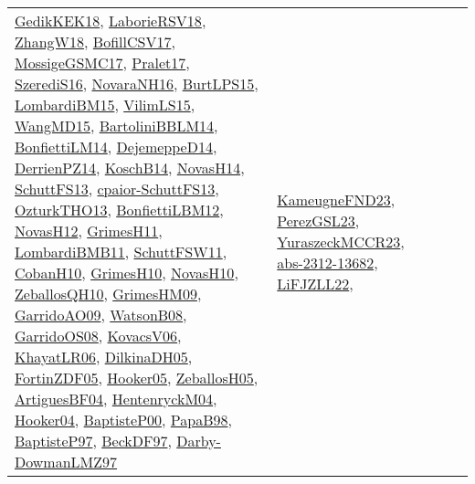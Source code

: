{\begin{longtable}{llp{6cm}p{6cm}p{6cm}}
\href{articles/GedikKEK18.pdf}{GedikKEK18}\cite{GedikKEK18}, \href{articles/LaborieRSV18.pdf}{LaborieRSV18}\cite{LaborieRSV18}, \href{articles/ZhangW18.pdf}{ZhangW18}\cite{ZhangW18}, \href{papers/BofillCSV17.pdf}{BofillCSV17}\cite{BofillCSV17}, \href{papers/MossigeGSMC17.pdf}{MossigeGSMC17}\cite{MossigeGSMC17}, \href{papers/Pralet17.pdf}{Pralet17}\cite{Pralet17}, \href{papers/SzerediS16.pdf}{SzerediS16}\cite{SzerediS16}, \href{articles/NovaraNH16.pdf}{NovaraNH16}\cite{NovaraNH16}, \href{papers/BurtLPS15.pdf}{BurtLPS15}\cite{BurtLPS15}, \href{papers/LombardiBM15.pdf}{LombardiBM15}\cite{LombardiBM15}, \href{papers/VilimLS15.pdf}{VilimLS15}\cite{VilimLS15}, \href{articles/WangMD15.pdf}{WangMD15}\cite{WangMD15}, \href{papers/BartoliniBBLM14.pdf}{BartoliniBBLM14}\cite{BartoliniBBLM14}, \href{papers/BonfiettiLM14.pdf}{BonfiettiLM14}\cite{BonfiettiLM14}, \href{papers/DejemeppeD14.pdf}{DejemeppeD14}\cite{DejemeppeD14}, \href{papers/DerrienPZ14.pdf}{DerrienPZ14}\cite{DerrienPZ14}, \href{papers/KoschB14.pdf}{KoschB14}\cite{KoschB14}, \href{articles/NovasH14.pdf}{NovasH14}\cite{NovasH14}, \href{papers/SchuttFS13.pdf}{SchuttFS13}\cite{SchuttFS13}, \href{papers/cpaior-SchuttFS13.pdf}{cpaior-SchuttFS13}\cite{cpaior-SchuttFS13}, \href{articles/OzturkTHO13.pdf}{OzturkTHO13}\cite{OzturkTHO13}, \href{papers/BonfiettiLBM12.pdf}{BonfiettiLBM12}\cite{BonfiettiLBM12}, \href{articles/NovasH12.pdf}{NovasH12}\cite{NovasH12}, \href{papers/GrimesH11.pdf}{GrimesH11}\cite{GrimesH11}, \href{papers/LombardiBMB11.pdf}{LombardiBMB11}\cite{LombardiBMB11}, \href{articles/SchuttFSW11.pdf}{SchuttFSW11}\cite{SchuttFSW11}, \href{papers/CobanH10.pdf}{CobanH10}\cite{CobanH10}, \href{papers/GrimesH10.pdf}{GrimesH10}\cite{GrimesH10}, \href{articles/NovasH10.pdf}{NovasH10}\cite{NovasH10}, \href{articles/ZeballosQH10.pdf}{ZeballosQH10}\cite{ZeballosQH10}, \href{papers/GrimesHM09.pdf}{GrimesHM09}\cite{GrimesHM09}, \href{articles/GarridoAO09.pdf}{GarridoAO09}\cite{GarridoAO09}, \href{papers/WatsonB08.pdf}{WatsonB08}\cite{WatsonB08}, \href{articles/GarridoOS08.pdf}{GarridoOS08}\cite{GarridoOS08}, \href{papers/KovacsV06.pdf}{KovacsV06}\cite{KovacsV06}, \href{articles/KhayatLR06.pdf}{KhayatLR06}\cite{KhayatLR06}, \href{papers/DilkinaDH05.pdf}{DilkinaDH05}\cite{DilkinaDH05}, \href{papers/FortinZDF05.pdf}{FortinZDF05}\cite{FortinZDF05}, \href{articles/Hooker05.pdf}{Hooker05}\cite{Hooker05}, \href{articles/ZeballosH05.pdf}{ZeballosH05}\cite{ZeballosH05}, \href{papers/ArtiguesBF04.pdf}{ArtiguesBF04}\cite{ArtiguesBF04}, \href{papers/HentenryckM04.pdf}{HentenryckM04}\cite{HentenryckM04}, \href{papers/Hooker04.pdf}{Hooker04}\cite{Hooker04}, \href{articles/BaptisteP00.pdf}{BaptisteP00}\cite{BaptisteP00}, \href{articles/PapaB98.pdf}{PapaB98}\cite{PapaB98}, \href{papers/BaptisteP97.pdf}{BaptisteP97}\cite{BaptisteP97}, \href{papers/BeckDF97.pdf}{BeckDF97}\cite{BeckDF97}, \href{articles/Darby-DowmanLMZ97.pdf}{Darby-DowmanLMZ97}\cite{Darby-DowmanLMZ97} & \href{papers/KameugneFND23.pdf}{KameugneFND23}\cite{KameugneFND23}, \href{papers/PerezGSL23.pdf}{PerezGSL23}\cite{PerezGSL23}, \href{articles/YuraszeckMCCR23.pdf}{YuraszeckMCCR23}\cite{YuraszeckMCCR23}, \href{articles/abs-2312-13682.pdf}{abs-2312-13682}\cite{abs-2312-13682}, \href{papers/LiFJZLL22.pdf}{LiFJZLL22}\cite{LiFJZLL22}, 
\end{longtable}}
